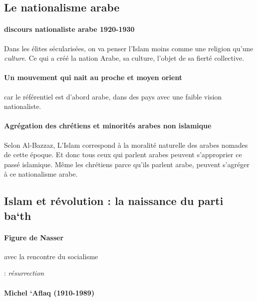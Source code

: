   
    
      \subsection{Le nationalisme arabe}
    
  
  \paragraph{discours nationaliste arabe 1920-1930} Dans les élites sécularisées, on va penser l'Islam moins comme une religion qu'une \textit{culture}. Ce qui a créé la nation Arabe, sa culture, l'objet de sa fierté collective. 
  
  \paragraph{Un mouvement qui nait au proche et moyen orient} car le référentiel est d'abord arabe, dans des pays avec une faible vision nationaliste.
  
  \paragraph{Agrégation des chrétiens et minorités arabes non islamique} Selon Al-Bazzaz, L'Islam correspond à la moralité naturelle des arabes nomades de cette époque. Et donc tous ceux qui parlent arabes peuvent s'approprier ce passé islamique. Même les chrétiens parce qu'ils parlent arabe, peuvent s'agréger à ce nationalisme arabe.
   
      \subsection{Islam et révolution : la naissance du parti ba`th}


  \paragraph{Figure de Nasser} avec la rencontre du socialisme
   

 \begin{Def}[ba'th] : \emph{résurrection}
\end{Def}
 
 


 
\paragraph{{Michel `Aflaq
(1910-1989)}} 

